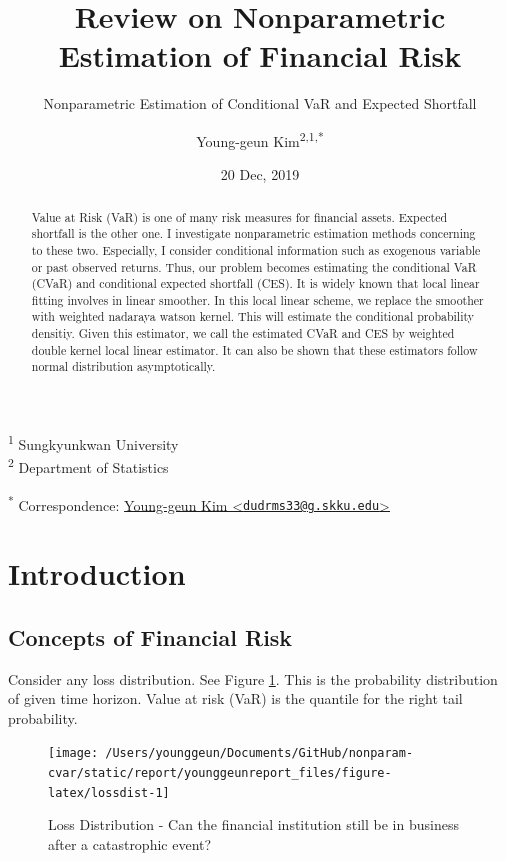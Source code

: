 \documentclass[
]{article}
\title{Review on Nonparametric Estimation of Financial Risk}
\subtitle{Nonparametric Estimation of Conditional VaR and Expected Shortfall}
\author{Young-geun Kim\textsuperscript{2,1,*}}
\date{20 Dec, 2019}
\theoremstyle{definition}
\theoremstyle{definition}
\theoremstyle{definition}
\theoremstyle{remark}
\begin{document}
\maketitle
\begin{abstract}
Value at Risk (VaR) is one of many risk measures for financial assets. Expected shortfall is the other one. I investigate nonparametric estimation methods concerning to these two. Especially, I consider conditional information such as exogenous variable or past observed returns. Thus, our problem becomes estimating the conditional VaR (CVaR) and conditional expected shortfall (CES). It is widely known that local linear fitting involves in linear smoother. In this local linear scheme, we replace the smoother with weighted nadaraya watson kernel. This will estimate the conditional probability densitiy. Given this estimator, we call the estimated CVaR and CES by weighted double kernel local linear estimator. It can also be shown that these estimators follow normal distribution asymptotically.
\end{abstract}

\textsuperscript{1} Sungkyunkwan University\\
\textsuperscript{2} Department of Statistics

\textsuperscript{*} Correspondence: \href{mailto:dudrms33@g.skku.edu}{Young-geun Kim \textless{}\href{mailto:dudrms33@g.skku.edu}{\nolinkurl{dudrms33@g.skku.edu}}\textgreater{}}

\hypertarget{introduction}{%
\section{Introduction}\label{introduction}}

\hypertarget{concepts-of-financial-risk}{%
\subsection{Concepts of Financial Risk}\label{concepts-of-financial-risk}}

Consider any loss distribution. See Figure \ref{fig:lossdist}. This is the probability distribution of given time horizon. Value at risk (VaR) is the quantile for the right tail probability.

\begin{figure}[H]

{\centering \texttt{[image: /Users/younggeun/Documents/GitHub/nonparam-cvar/static/report/younggeunreport\_files/figure-latex/lossdist-1]} 

}

\caption{Loss Distribution - Can the financial institution still be in business after a catastrophic event?}\label{fig:lossdist}
\end{figure}
\end{document}
